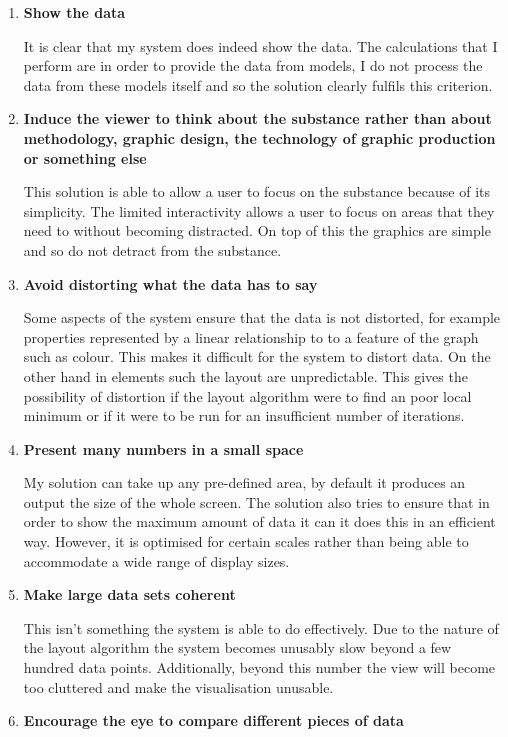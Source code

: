 \documentclass[12pt,a4paper]{article}
\begin{document}
\begin{enumerate}
\item {\bf Show the data}

It is clear that my system does indeed show the data. The calculations that I perform are in order to provide the data from models, I do not process the data from these models itself and so the solution clearly fulfils this criterion.

\item {\bf Induce the viewer to think about the substance rather than about methodology, graphic design, the technology of graphic production or something else}

This solution is able to allow a user to focus on the substance because of its simplicity. The limited interactivity allows a user to focus on areas that they need to without becoming distracted. On top of this the graphics  are simple and so do not detract from the substance.

\item {\bf Avoid distorting what the data has to say}

Some aspects of the system ensure that the data is not distorted, for example properties represented by a linear relationship to to a feature of the graph such as colour. This makes it difficult for the system to distort data. On the other hand in elements such the layout are unpredictable. This gives the possibility of distortion if the layout algorithm were to find an poor local minimum or if it were to be run for an insufficient number of iterations.

\item {\bf Present many numbers in a small space}

My solution can take up any pre-defined area, by default it produces an output the size of the whole screen. The solution also tries to ensure that in order to show the maximum amount of data it can it does this in an efficient way. However, it is optimised for certain scales rather than being able to accommodate a wide range of display sizes.

\item {\bf Make large data sets coherent}

This isn't something the system is able to do effectively. Due to the nature of the layout algorithm the system becomes unusably slow beyond a few hundred data points. Additionally, beyond this number the view will become too cluttered and make the visualisation unusable.

\item {\bf Encourage the eye to compare different pieces of data}


\end{enumerate}
\end{document}
